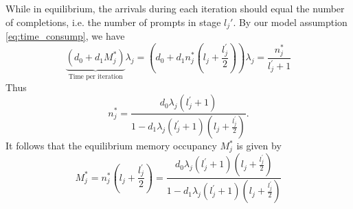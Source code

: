 While in equilibrium, the arrivals during each iteration should equal the number of completions, i.e. the number of prompts in stage $l_j'$. By our model assumption \eqref{eq:time_consump}, we have 
$$ \underset{\text{Time per iteration}}{\underbrace{(d_0+d_1M_j^{*} )}}\lambda_j =\left(d_0+d_1 n_j^*\left( l_j +\frac{l_j^{\prime}}{2} \right) \right)\lambda_j= \frac{n_j^*}{l_j^{\prime}+1} $$
Thus
$$n_j^* = \frac{d_0\lambda_j(l_j^{\prime}+1)}{1-d_1\lambda_j(l_j^{\prime}+1)(l_j+\frac{l_j^{\prime}}{2})}.$$
It follows that the equilibrium memory occupancy $M_j^*$ is given by
\begin{equation}
    \label{eq:memory_single}
M_j^* = n_j^*\left( l_j+\frac{l_j^{\prime}}{2} \right) 
=  \frac{d_0\lambda_j(l_j^{\prime}+1)\left( l_j+\frac{l_j^{\prime}}{2} \right) }{1-d_1\lambda_j(l_j^{\prime}+1)(l_j+\frac{l_j^{\prime}}{2})}
\end{equation}

